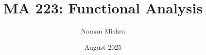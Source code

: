 \documentclass[12pt]{report}
\title{MA 223: Functional Analysis}
\author{Naman Mishra}
\date{August 2025}
\begin{document}
\maketitle
\tableofcontents
\listoflecture
    
\end{document}
